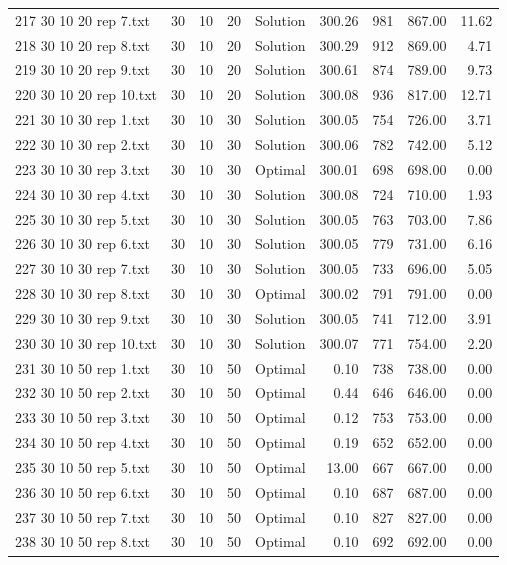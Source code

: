 \begin{longtable}{lrrllrrrr}
217 30 10 20 rep 7.txt & 30 & 10 & 20 & Solution & 300.26 & 981 & 867.00 & 11.62\\
218 30 10 20 rep 8.txt & 30 & 10 & 20 & Solution & 300.29 & 912 & 869.00 &  4.71\\
219 30 10 20 rep 9.txt & 30 & 10 & 20 & Solution & 300.61 & 874 & 789.00 &  9.73\\
220 30 10 20 rep 10.txt & 30 & 10 & 20 & Solution & 300.08 & 936 & 817.00 & 12.71\\
221 30 10 30 rep 1.txt & 30 & 10 & 30 & Solution & 300.05 & 754 & 726.00 &  3.71\\
222 30 10 30 rep 2.txt & 30 & 10 & 30 & Solution & 300.06 & 782 & 742.00 &  5.12\\
223 30 10 30 rep 3.txt & 30 & 10 & 30 & Optimal & 300.01 & 698 & 698.00 &  0.00\\
224 30 10 30 rep 4.txt & 30 & 10 & 30 & Solution & 300.08 & 724 & 710.00 &  1.93\\
225 30 10 30 rep 5.txt & 30 & 10 & 30 & Solution & 300.05 & 763 & 703.00 &  7.86\\
226 30 10 30 rep 6.txt & 30 & 10 & 30 & Solution & 300.05 & 779 & 731.00 &  6.16\\
227 30 10 30 rep 7.txt & 30 & 10 & 30 & Solution & 300.05 & 733 & 696.00 &  5.05\\
228 30 10 30 rep 8.txt & 30 & 10 & 30 & Optimal & 300.02 & 791 & 791.00 &  0.00\\
229 30 10 30 rep 9.txt & 30 & 10 & 30 & Solution & 300.05 & 741 & 712.00 &  3.91\\
230 30 10 30 rep 10.txt & 30 & 10 & 30 & Solution & 300.07 & 771 & 754.00 &  2.20\\
231 30 10 50 rep 1.txt & 30 & 10 & 50 & Optimal &  0.10 & 738 & 738.00 &  0.00\\
232 30 10 50 rep 2.txt & 30 & 10 & 50 & Optimal &  0.44 & 646 & 646.00 &  0.00\\
233 30 10 50 rep 3.txt & 30 & 10 & 50 & Optimal &  0.12 & 753 & 753.00 &  0.00\\
234 30 10 50 rep 4.txt & 30 & 10 & 50 & Optimal &  0.19 & 652 & 652.00 &  0.00\\
235 30 10 50 rep 5.txt & 30 & 10 & 50 & Optimal & 13.00 & 667 & 667.00 &  0.00\\
236 30 10 50 rep 6.txt & 30 & 10 & 50 & Optimal &  0.10 & 687 & 687.00 &  0.00\\
237 30 10 50 rep 7.txt & 30 & 10 & 50 & Optimal &  0.10 & 827 & 827.00 &  0.00\\
238 30 10 50 rep 8.txt & 30 & 10 & 50 & Optimal &  0.10 & 692 & 692.00 &  0.00\\

\end{longtable}
